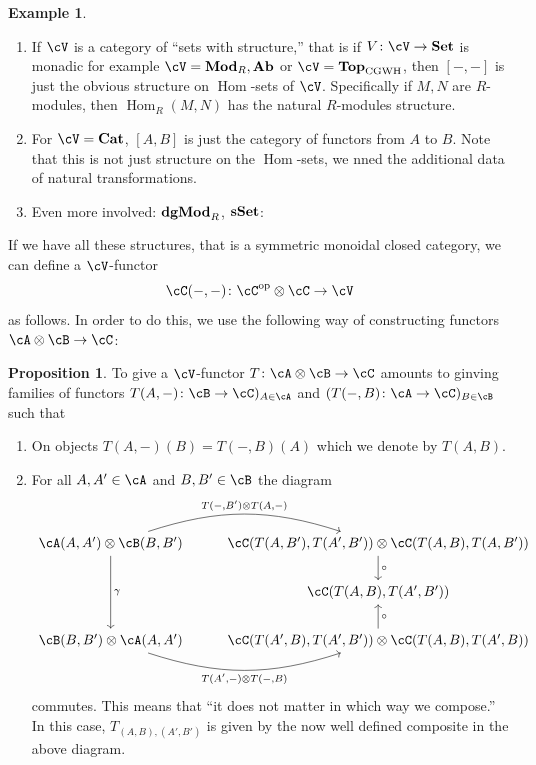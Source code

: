 \documentclass[a4paper,11pt,oneside,openany]{scrbook}
\newcommand{\catname}[1]{{\normalfont\textbf{#1}}}
\newcommand{\Set}{\catname{Set}}
\newcommand{\Top}{\catname{Top}}
\newcommand{\Ab}{\catname{Ab}}
\newcommand{\Mod}{\catname{Mod}}
\newcommand{\dgMod}{\catname{dgMod}}
\newcommand{\sSet}{\catname{sSet}}
\newcommand{\Cat}{\catname{Cat}}
\newcommand{\from}{\colon}
\DeclareMathOperator{\Hom}{\text{Hom}}
\DeclareMathOperator{\op}{\text{op}}
\theoremstyle{definition}
\theoremstyle{definition}
\newtheorem{prop}[thm]{Proposition}
\newtheorem{exmp}[thm]{Example}
\begin{document}
\begin{exmp}
    \begin{enumerate}[label=\arabic*)]
	\item 
	   If $ \cV $ is a category of ``sets with structure,'' that is if $ V \from \cV \to \Set $ is monadic for example $ \cV = \Mod_R,\Ab $ or $ \cV = \Top_{\mathrm{CGWH}} $, then $ [-,-] $ is just the obvious structure on $ \Hom $-sets of $ \cV $.
	   Specifically if $ M,N $ are $ R $-modules, then $ \Hom_R(M,N) $ has the natural $ R $-modules structure.
       \item
	   For $ \cV = \Cat $, $ [A,B] $ is just the category of functors from $ A $ to $ B $. Note that this is not just structure on the $ \Hom $-sets, we nned the additional data of natural transformations.
       \item Even more involved: $ \dgMod_R$, $\sSet $: 
    \end{enumerate}
\end{exmp}
If we have all these structures, that is a symmetric monoidal closed category, we can define a $ \cV $-functor
\begin{displaymath}
    \cC(-,-) \from \cC^{\op}\otimes \cC \to \cV
\end{displaymath}
as follows.
In order to do this, we use the following way of constructing functors $ \cA\otimes \cB \to \cC $:
\begin{prop}
    To give a $ \cV $-functor $ T\from \cA \otimes \cB \to \cC $ amounts to ginving families of functors $ T(A,-)\from \cB \to \cC)_{A \in \cA} $ and $ (T(-,B) \from \cA \to \cC)_{B\in \cB} $ such that
    \begin{enumerate}[label=\roman*)]
	\item
	    On objects $ T(A,-)(B) = T(-,B)(A) $ which we denote by $ T(A,B) $.
	\item 
	    For all $ A,A' \in \cA $ and $ B,B' \in \cB $ the diagram
	    \begin{displaymath}
		\begin{tikzcd}%
		    \cA(A,A')\otimes \cB(B,B')
		    \arrow[r, "{T(-,B')\otimes T(A,-)}", bend left=18]
		    \arrow[dd, "\gamma"]
		    &
		    \cC(T(A,B') ,T(A',B')) \otimes \cC(T(A,B) ,T(A,B'))
		    \arrow[d, "\circ"]
		    \\
		    & \cC(T(A,B),T(A',B'))
		    \\
		    \cB(B,B') \otimes \cA(A,A') 
		    \arrow[r, "{T(A',-)\otimes T(-,B)}"', bend right=18]
		    & \cC(T(A',B) ,T(A',B')) \otimes \cC(T(A,B) ,T(A',B))
		    \arrow[u, "\circ"']
	        \end{tikzcd}
	    \end{displaymath}
	    commutes.
	    This means that ``it does not matter in which way we compose.''
	    In this case, $ T_{(A,B),(A',B')}  $ is given by the now well defined composite in the above diagram.
    \end{enumerate}
\end{prop}
\end{document}

